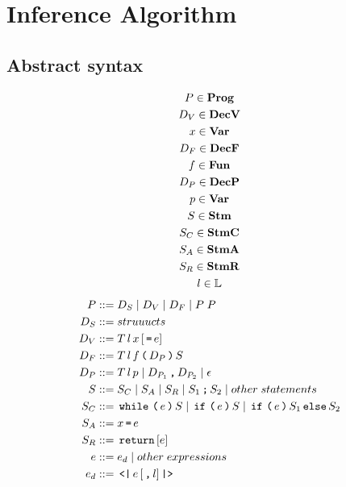 
\section{Inference Algorithm}

\subsection{Abstract syntax}

\begin{gather*}
  P \in \mathbf{Prog}\\
  D_V \in \mathbf{DecV}\\
  x \in \mathbf{Var}\\
  D_F \in \mathbf{DecF} \\
  f \in \mathbf{Fun}\\
  D_P \in \mathbf{DecP}\\
  p \in \mathbf{Var}\\
  S \in \mathbf{Stm}\\
  S_C \in \mathbf{StmC}\\
  S_A \in \mathbf{StmA}\\
  S_R \in \mathbf{StmR}\\
  l \in \mathbb{L}\\
\end{gather*}
\begin{align*}
  P       & ::= D_S \gp D_V \gp D_F \gp P \; P \\
  D_S     & ::= struuucts\\
  D_V     & ::= T \, l \, x \, [\tk = e] \\
  D_F     & ::= T \, l \, f \tk ( D_P \tk ) S \\
  D_P     & ::= T \, l \, p \gp D_{P_1} \tk , D_{P_2} \gp \epsilon \\
  S       & ::= S_C \gp S_A \gp S_R \gp S_1 \tk ; S_2 \gp other \; statements \\
  S_C     & ::= \tk{while} \tk ( e \tk ) S \gp \tk{if} \tk ( e \tk ) S \gp \tk{if} \tk ( e \tk ) S_1 \tk{else} S_2 \\
  S_A     & ::= x \tk = e \\
  S_R     & ::= \tk{return} [e] \\
  e       & ::= e_d \gp other \; expressions \\
  e_d     & ::= \tk{<|} e \, [\tk , l] \tk{|>}
\end{align*}

